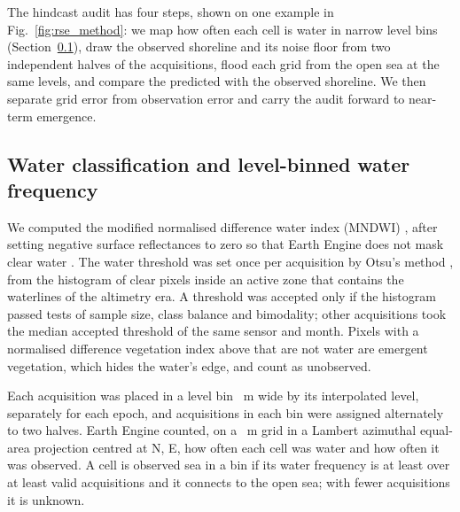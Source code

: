 
The hindcast audit has four steps, shown on one example in Fig.~\ref{fig:rse_method}: we map how often each cell is water in narrow level bins (Section~\ref{sec:water}), draw the observed shoreline and its noise floor from two independent halves of the acquisitions, flood each grid from the open sea at the same levels, and compare the predicted with the observed shoreline. We then separate grid error from observation error and carry the audit forward to near-term emergence.

\subsection{Water classification and level-binned water frequency}
\label{sec:water}
We computed the modified normalised difference water index (MNDWI) \citep{xu2006}, after setting negative surface reflectances to zero so that Earth Engine does not mask clear water \citep{ee_normalizeddifference}. The water threshold was set once per acquisition by Otsu's method \citep{otsu1979}, from the histogram of clear pixels inside an active zone that contains the waterlines of the altimetry era. A threshold was accepted only if the histogram passed tests of sample size, class balance and bimodality; other acquisitions took the median accepted threshold of the same sensor and month. Pixels with a normalised difference vegetation index above  that are not water are emergent vegetation, which hides the water's edge, and count as unobserved. 



Each acquisition was placed in a level bin ~m wide by its interpolated level, separately for each epoch, and acquisitions in each bin were assigned alternately to two halves. Earth Engine counted, on a ~m grid in a Lambert azimuthal equal-area projection centred at \textdegree{}N, \textdegree{}E, how often each cell was water and how often it was observed. A cell is observed sea in a bin if its water frequency is at least  over at least  valid acquisitions and it connects to the open sea; with fewer acquisitions it is unknown.

